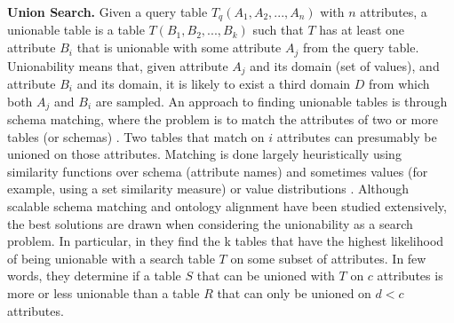 \textbf{Union Search.} Given a query table $T_q(A_1,A_2,...,A_n)$ with $n$ attributes, a unionable table is a table $T(B_1, B_2,...,B_k)$ such that $T$ has at least one attribute $B_i$ that is unionable with some attribute $A_j$ from the query table. Unionability means that, given attribute $A_j$ and its domain (set of values), and attribute $B_i$ and its domain, it is likely to exist a third domain $D$ from which both $A_j$ and $B_i$ are sampled. An approach to finding unionable tables is through schema matching, where the problem is to match the attributes of two or more tables (or schemas) \cite{he2003statistical,rahm2011towards}. Two tables that match on $i$ attributes can presumably be unioned on those attributes. Matching is done largely heuristically using similarity functions over schema (attribute names) and sometimes values (for example, using a set similarity measure) or value distributions \cite{kang2003schema}. Although scalable schema matching and ontology alignment have been studied extensively, the best solutions are drawn when considering the unionability as a search problem. In particular, in \cite{nargesian2018table} they find the k tables that have the highest likelihood of being unionable with a search table $T$ on some subset of attributes. In few words, they determine if a table $S$ that can be unioned with $T$ on $c$ attributes is more or less unionable than a table $R$ that can only be unioned on $d < c$ attributes.
\bigbreak

